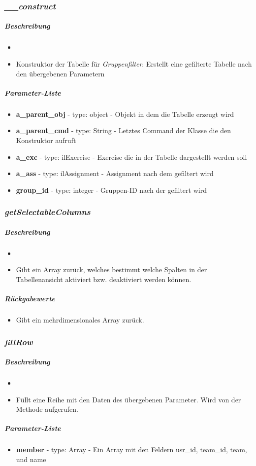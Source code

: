 \subsubsection*{\textit{\_\_construct}}\label{constructEMT}
\subparagraph{Beschreibung}
\begin{itemize}
	\item[] \noindent{}
	\item[] Konstruktor der Tabelle für \textit{Gruppenfilter}. Erstellt eine gefilterte Tabelle nach den übergebenen Parametern
\end{itemize}
\subparagraph{Parameter-Liste}
\begin{itemize}
	\item[] \textbf{a\_parent\_obj} - type: object - Objekt in dem die Tabelle erzeugt wird
	\item[] \textbf{a\_parent\_cmd} - type: String - Letztes Command der Klasse die den Konstruktor aufruft
	\item[]\textbf{a\_exc} - type: ilExercise - Exercise die in der Tabelle dargestellt werden soll
	\item[]\textbf{a\_ass} - type: ilAssignment - Assignment nach dem gefiltert wird
	\item[]\textbf{group\_id} - type: integer - Gruppen-ID nach der gefiltert wird
\end{itemize}

\subsubsection*{\textit{getSelectableColumns}}\label{getSelectableColumnsEMT}
\subparagraph{Beschreibung}
\begin{itemize}
	\item[] \noindent{}
	\item[] Gibt ein Array zurück, welches bestimmt welche Spalten in der Tabellenansicht aktiviert bzw. deaktiviert werden können.
\end{itemize}
\subparagraph{Rückgabewerte}
\begin{itemize}
	\item[] Gibt ein mehrdimensionales Array zurück.
\end{itemize}

\subsubsection*{\textit{fillRow}}\label{fillRowEMT}
\subparagraph{Beschreibung}
\begin{itemize}
	\item[] \noindent{}
	\item[] Füllt eine Reihe mit den Daten des übergebenen Parameter. Wird von der Methode  aufgerufen.
\end{itemize}
\subparagraph{Parameter-Liste}
\begin{itemize}
	\item[] \textbf{member} - type: Array - Ein Array mit den Feldern usr\_id, team\_id, team, und name
\end{itemize}

